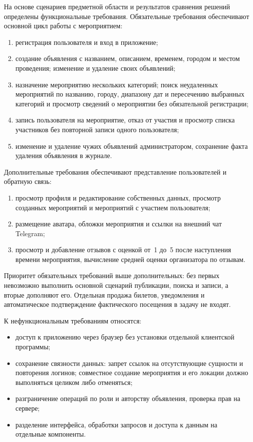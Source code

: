 На основе сценариев предметной области и результатов сравнения решений определены функциональные требования. Обязательные требования обеспечивают основной цикл работы с мероприятием:
\begin{enumerate}[label=\arabic*)]
    \item регистрация пользователя и вход в приложение;
    \item создание объявления с названием, описанием, временем, городом и местом проведения; изменение и удаление своих объявлений;
    \item назначение мероприятию нескольких категорий; поиск неудаленных мероприятий по названию, городу, диапазону дат и пересечению выбранных категорий и просмотр сведений о мероприятии без обязательной регистрации;
    \item запись пользователя на мероприятие, отказ от участия и просмотр списка участников без повторной записи одного пользователя;
    \item изменение и удаление чужих объявлений администратором, сохранение факта удаления объявления в журнале.
\end{enumerate}

Дополнительные требования обеспечивают представление пользователей и обратную связь:
\begin{enumerate}[label=\arabic*),start=6]
    \item просмотр профиля и редактирование собственных данных, просмотр созданных мероприятий и мероприятий с участием пользователя;
    \item размещение аватара, обложки мероприятия и ссылки на внешний чат Telegram;
    \item просмотр и добавление отзывов с оценкой от~1 до~5 после наступления времени мероприятия, вычисление средней оценки организатора по отзывам.
\end{enumerate}

Приоритет обязательных требований выше дополнительных: без первых невозможно выполнить основной сценарий публикации, поиска и записи, а вторые дополняют его. Отдельная продажа билетов, уведомления и автоматическое подтверждение фактического посещения в задачу не входят.

К нефункциональным требованиям относятся:
\begin{itemize}
    \item доступ к приложению через браузер без установки отдельной клиентской программы;
    \item сохранение связности данных: запрет ссылок на отсутствующие сущности и повторения логинов; совместное создание мероприятия и его локации должно выполняться целиком либо отменяться;
    \item разграничение операций по роли и авторству объявления, проверка прав на сервере;
    \item разделение интерфейса, обработки запросов и доступа к данным на отдельные компоненты.
\end{itemize}

